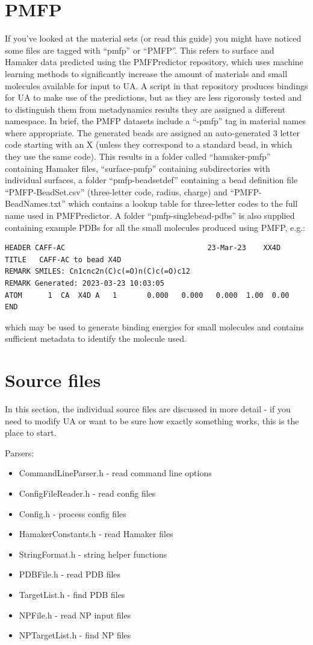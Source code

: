 \documentclass[10pt,a4paper,onecolumn]{report}
\begin{document}
\section{PMFP} \label{section:pmfp}
If you've looked at the material sets (or read this guide) you might have noticed some files are tagged with ``pmfp'' or ``PMFP''. This refers to surface and Hamaker data predicted using the PMFPredictor repository, which uses machine learning methods to significantly increase the amount of materials and small molecules available for input to UA. A script in that repository produces bindings for UA to make use of the predictions, but as they are less rigorously tested and to distinguish them from metadynamics results they are assigned a different namespace. In brief, the PMFP datasets include a ``-pmfp'' tag in material names where appropriate. The generated beads are assigned an auto-generated 3 letter code starting with an X (unless they correspond to a standard bead, in which they use the same code). This results in a folder called ``hamaker-pmfp'' containing Hamaker files, ``surface-pmfp'' containing subdirectories with individual surfaces, a folder ``pmfp-beadsetdef'' containing a bead definition file ``PMFP-BeadSet.csv'' (three-letter code, radius, charge) and ``PMFP-BeadNames.txt'' which contains a lookup table for three-letter codes to the full name used in PMFPredictor. A folder ``pmfp-singlebead-pdbs'' is also supplied containing example PDBs for all the small molecules produced using PMFP, e.g.:
\begin{lstlisting}
HEADER CAFF-AC                                 23-Mar-23    XX4D
TITLE   CAFF-AC to bead X4D
REMARK SMILES: Cn1cnc2n(C)c(=O)n(C)c(=O)c12
REMARK Generated: 2023-03-23 10:03:05
ATOM      1  CA  X4D A   1       0.000   0.000   0.000  1.00  0.00
END
\end{lstlisting}
which may be used to generate binding energies for small molecules and contains sufficient metadata to identify the molecule used. 
 

\section{Source files}
In this section, the individual source files are discussed in more detail - if you need to modify UA or want to be sure how exactly something works, this is the place to start.

Parsers:
\begin{itemize}
\item CommandLineParser.h - read command line options
\item ConfigFileReader.h - read config files
\item Config.h - process config files
\item HamakerConstants.h - read Hamaker files
\item StringFormat.h - string helper functions
\item PDBFile.h - read PDB files
\item TargetList.h - find PDB files
\item NPFile.h - read NP input files
\item NPTargetList.h - find NP files

\end{itemize} 
\end{document}
